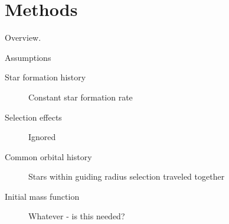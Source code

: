 


\section{Methods} \label{sec:methods}

Overview.

Assumptions

\begin{description}
    \item[Star formation history] Constant star formation rate
    \item[Selection effects] Ignored
    \item[Common orbital history] Stars within guiding radius selection traveled together
    \item[Initial mass function] Whatever - is this needed?
\end{description}

